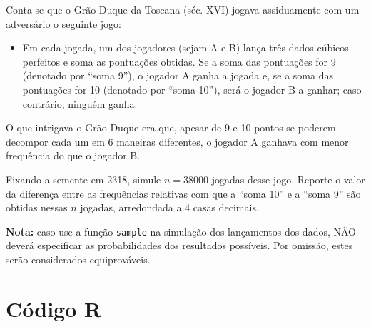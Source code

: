 \documentclass[11pt,a4paper]{article}
\begin{document}
\begin{tcolorbox}[colback=blue!5!white,colframe=blue!75!black,title=Jogo do Grão-Duque da Toscana - Exercício 5]

Conta-se que o Grão-Duque da Toscana (séc. XVI) jogava assiduamente com um adversário o seguinte jogo:

\begin{itemize}
    \item Em cada jogada, um dos jogadores (sejam A e B) lança três dados cúbicos perfeitos e soma as pontuações obtidas. Se a soma das pontuações for 9 (denotado por ``soma 9''), o jogador A ganha a jogada e, se a soma das pontuações for 10 (denotado por ``soma 10''), será o jogador B a ganhar; caso contrário, ninguém ganha.
\end{itemize}

O que intrigava o Grão-Duque era que, apesar de 9 e 10 pontos se poderem decompor cada um em 6 maneiras diferentes, o jogador A ganhava com menor frequência do que o jogador B.

Fixando a semente em 2318, simule \( n = 38000 \) jogadas desse jogo. Reporte o valor da diferença entre as frequências relativas com que a ``soma 10'' e a ``soma 9'' são obtidas nessas \( n \) jogadas, arredondada a 4 casas decimais.

\textbf{Nota:} caso use a função \texttt{sample} na simulação dos lançamentos dos dados, NÃO deverá especificar as probabilidades dos resultados possíveis. Por omissão, estes serão considerados equiprováveis.

\end{tcolorbox}

\section*{Código R}
\end{document}
